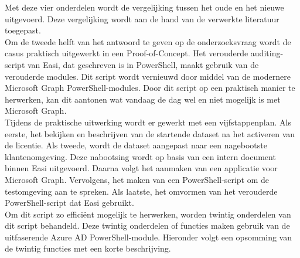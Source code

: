 Met deze vier onderdelen wordt de vergelijking tussen het oude en het nieuwe uitgevoerd. Deze vergelijking wordt aan de hand van de verwerkte literatuur toegepast. \\

Om de tweede helft van het antwoord te geven op de onderzoeksvraag wordt de casus praktisch uitgewerkt in een Proof-of-Concept. Het verouderde auditing-script van Easi, dat geschreven is in PowerShell, maakt gebruik van de verouderde modules. Dit script wordt vernieuwd door middel van de modernere Microsoft Graph PowerShell-modules. Door dit script op een praktisch manier te herwerken, kan dit aantonen wat vandaag de dag wel en niet mogelijk is met Microsoft Graph. \\

Tijdens de praktische uitwerking wordt er gewerkt met een vijfstappenplan. Als eerste, het bekijken en beschrijven van de startende dataset na het activeren van de licentie. Als tweede, wordt de dataset aangepast naar een nagebootste klantenomgeving. Deze nabootsing wordt op basis van een intern document binnen Easi uitgevoerd. Daarna volgt het aanmaken van een applicatie voor Microsoft Graph. Vervolgens, het maken van een PowerShell-script om de testomgeving aan te spreken. Als laatste, het omvormen van het verouderde PowerShell-script dat Easi gebruikt. \\

Om dit script zo efficiënt mogelijk te herwerken, worden twintig onderdelen van dit script behandeld. Deze twintig onderdelen of functies maken gebruik van de uitfaserende Azure \ac{AD} PowerShell-module. Hieronder volgt een opsomming van de twintig functies met een korte beschrijving. 

